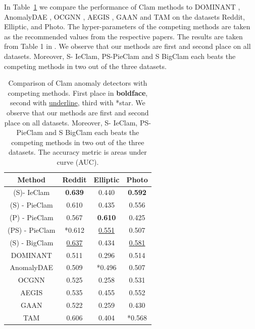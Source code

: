 \documentclass[letterpaper]{article} %
\begin{document}
In Table~\ref{Table1} we compare the performance of Clam methods to DOMINANT \cite{ding2019dominant}, AnomalyDAE \cite{fan2020anomalydae}, OCGNN \cite{wang2021ocgnn}, AEGIS \cite{ding2021aegis}, GAAN \cite{chen2020gaan} and TAM \cite{qiao2024tam} on the datasets Reddit, Elliptic, and Photo. The hyper-parameters of the competing methods are taken as the recommended values from the respective papers. The results are taken from Table 1 in \cite{qiao2024ggad}.
We observe that our methods are first and second place on all datasets. Moreover, S- IeClam, PS-PieClam and S BigClam each beats the competing methods in two out of the three datasets.





        

\begin{table}[t]
\centering
\begin{tabular}{|c|c|c|c|}
    \hline
  Method  & Reddit& Elliptic& Photo\\
    \hline

 (S)- IeClam& \textbf{0.639}& 0.440&\textbf{0.592}\\
 (S) - PieClam& 0.610& 0.435&0.556\\
 (P) - PieClam& 0.567& \textbf{0.610}&0.425\\
 (PS) - PieClam& *0.612& \underline{0.551}&0.507\\
 (S) - BigClam & \underline{0.637}& 0.434&\underline{0.581}\\
 \hline
 DOMINANT  & 0.511& 0.296&0.514\\
 AnomalyDAE &0.509& *0.496&0.507\\
 OCGNN  &0.525 & 0.258&0.531\\
 AEGIS &0.535 & 0.455&0.552\\
 GAAN &0.522 &0.259 &0.430\\
 TAM &0.606 & 0.404 & *0.568\\
 \hline
\end{tabular}
\caption{Comparison of Clam anomaly detectors with competing methods. %
 First place in \textbf{boldface}, second with \underline{underline}, third with *star. We observe that our methods are first and second place on all datasets. Moreover, S- IeClam, PS-PieClam and S BigClam each beats the competing methods in two out of the three datasets. The accuracy metric is areas under curve (AUC).}
\label{Table1}
\end{table}
\end{document}
